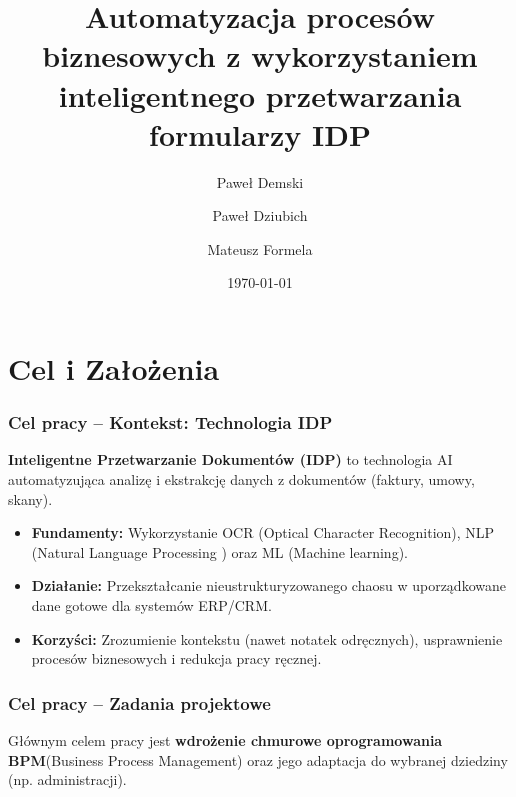 \documentclass[11pt]{beamer}
\title[Automatyzacja procesów biznesowych z IDP]{Automatyzacja procesów biznesowych z wykorzystaniem inteligentnego przetwarzania formularzy IDP}
\author[Demski, Dziubich, Formela]{
    Paweł Demski \and 
    Paweł Dziubich \and 
    Mateusz Formela
}
\institute[PG]{
    Promotor: dr inż. Krzysztof Bikonis\\
    \smallskip 
    \textit{Ktedra Systemów Geoinformatycznych}
}
\date{\today}
\begin{document}
\begin{frame}
    \titlepage 
\end{frame}


\section{Cel i Założenia}


\begin{frame}
    \frametitle{Cel pracy – Kontekst: Technologia IDP}
    \textbf{Inteligentne Przetwarzanie Dokumentów (IDP)} to technologia AI automatyzująca analizę i ekstrakcję danych z dokumentów (faktury, umowy, skany).
    
    \bigskip
    \begin{itemize}
        \item \textbf{Fundamenty:} Wykorzystanie OCR (Optical Character Recognition), NLP (Natural Language Processing ) oraz ML (Machine learning).
        \item \textbf{Działanie:} Przekształcanie nieustrukturyzowanego chaosu w uporządkowane dane gotowe dla systemów ERP/CRM.
        \item \textbf{Korzyści:} Zrozumienie kontekstu (nawet notatek odręcznych), usprawnienie procesów biznesowych i redukcja pracy ręcznej.
    \end{itemize}
\end{frame}


\begin{frame}
    \frametitle{Cel pracy – Zadania projektowe}
    Głównym celem pracy jest \textbf{wdrożenie chmurowe oprogramowania BPM}(Business Process Management) oraz jego adaptacja do wybranej dziedziny (np. administracji).
    
    \bigskip
\end{frame}
\end{document}
